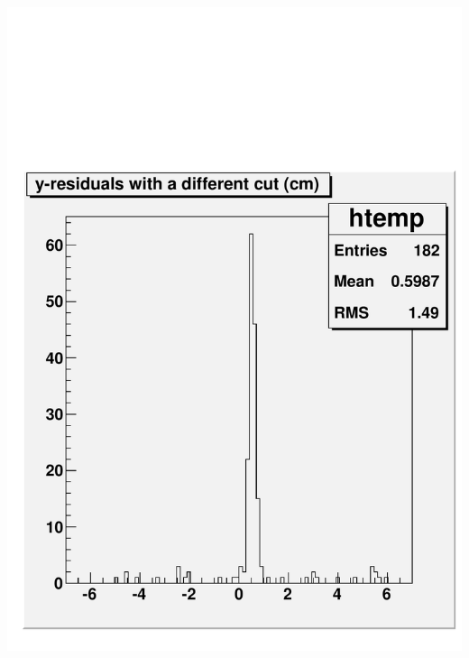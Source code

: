 \documentclass[compress]{beamer}
\begin{document}
\begin{frame}
\begin{columns}
\includegraphics[width=\linewidth]{selectioneffect_resid_withanothercut.pdf}
\end{columns}
\label{numpages}
\end{frame}
\end{document}
